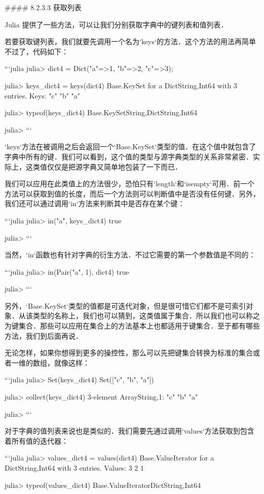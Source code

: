 #### 8.2.3.3 获取列表

Julia 提供了一些方法，可以让我们分别获取字典中的键列表和值列表．

若要获取键列表，我们就要先调用一个名为`keys`的方法．这个方法的用法再简单不过了，代码如下：

```julia
julia> dict4 = Dict("a"=>1, "b"=>2, "c"=>3);

julia> keys_dict4 = keys(dict4)
Base.KeySet for a Dict{String,Int64} with 3 entries. Keys:
  "c"
  "b"
  "a"

julia> typeof(keys_dict4)
Base.KeySet{String,Dict{String,Int64}}

julia> 
```

`keys`方法在被调用之后会返回一个`Base.KeySet`类型的值．在这个值中就包含了字典中所有的键．我们可以看到，这个值的类型与源字典类型的关系非常紧密．实际上，这类值仅仅是把源字典又简单地包装了一下而已．

我们可以应用在此类值上的方法很少，恐怕只有`length`和`isempty`可用．前一个方法可以获取到值的长度，而后一个方法则可以判断值中是否没有任何键．另外，我们还可以通过调用`in`方法来判断其中是否存在某个键：

```julia
julia> in("a", keys_dict4)
true

julia> 
```

当然，`in`函数也有针对字典的衍生方法．不过它需要的第一个参数值是不同的：

```julia
julia> in(Pair("a", 1), dict4)
true

julia> 
```

另外，`Base.KeySet`类型的值都是可迭代对象，但是很可惜它们都不是可索引对象．从该类型的名称上，我们也可以猜到，这类值属于集合．所以我们也可以称之为键集合．那些可以应用在集合上的方法基本上也都适用于键集合．至于都有哪些方法，我们到后面再说．

无论怎样，如果你想得到更多的操控性，那么可以先把键集合转换为标准的集合或者一维的数组，就像这样：

```julia
julia> Set(keys_dict4)
Set(["c", "b", "a"])

julia> collect(keys_dict4)
3-element Array{String,1}:
 "c"
 "b"
 "a"

julia> 
```

对于字典的值列表来说也是类似的．我们需要先通过调用`values`方法获取到包含着所有值的迭代器：

```julia
julia> values_dict4 = values(dict4)
Base.ValueIterator for a Dict{String,Int64} with 3 entries. Values:
  3
  2
  1

julia> typeof(values_dict4)
Base.ValueIterator{Dict{String,Int64}}

